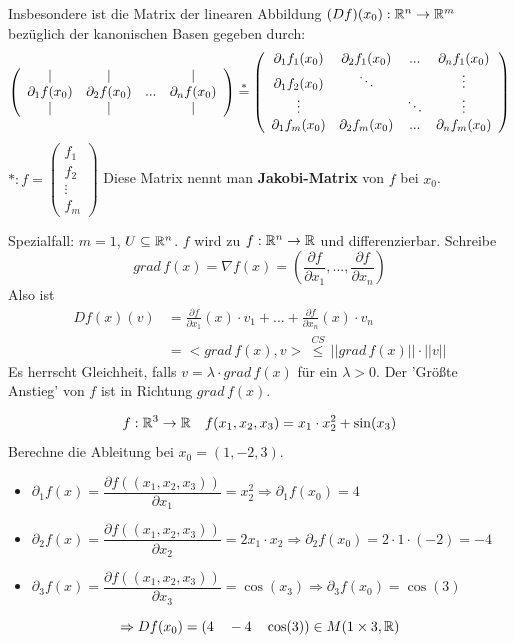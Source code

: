 \documentclass[main.tex]{subfiles}
\begin{document}
\begin{Bemerkung}
  Insbesondere ist die Matrix der linearen Abbildung $(Df)(x_0): \mathbb{R}^n \to \mathbb{R}^m$ bezüglich der kanonischen Basen gegeben durch:
  $$\left(\begin{array}{c c c c}
    | & | & & | \\
    \partial_1 f(x_0) & \partial_2 f(x_0) & ... & \partial_n f(x_0) \\
    | & | & & |
  \end{array}\right)
  \stackrel{*}{=}
  \left(\begin{array}{c c c c}
    \partial_1 f_1(x_0) & \partial_2 f_1(x_0) & ... & \partial_n f_1(x_0) \\
    \partial_1 f_2(x_0) & \ddots & & \vdots \\
    \vdots & & \ddots & \vdots \\
    \partial_1 f_m(x_0) & \partial_2 f_m(x_0) & ... & \partial_n f_m(x_0)
  \end{array}\right)$$
  $*: f = \left(\begin{array}{c}f_1\\f_2\\ \vdots \\f_m\end{array}\right)$
  Diese Matrix nennt man \textbf{Jakobi-Matrix} von $f$ bei $x_0$.

  Spezialfall: $m=1$, $U \subseteq \mathbb{R}^n$. $f$ wird zu $f: \mathbb{R}^n \to \mathbb{R}$ und differenzierbar. Schreibe
  $$grad \, f(x) = \nabla f(x) = \left(\frac{\partial f}{\partial x_1}, ...,  \frac{\partial f}{\partial x_n}\right)$$
  Also ist
  $$\begin{aligned}
    Df(x)(v) & = \frac{\partial f}{\partial x_1} (x) \cdot v_1 + ... + \frac{\partial f}{\partial x_n} (x) \cdot v_n \\
    & = < grad \, f(x), v > \, \stackrel{CS}{\leq} \, ||grad \, f(x)|| \cdot ||v||
  \end{aligned}$$
  Es herrscht Gleichheit, falls $v = \lambda \cdot grad \, f(x)$ für ein $\lambda > 0$. Der 'Größte Anstieg' von $f$ ist in Richtung $grad \, f(x)$.
\end{Bemerkung}

\begin{Beispiel}[$f:\R^3 \to \R$]
    $$f: \mathbb{R}^3 \to \mathbb{R} \quad f(x_1,x_2,x_3) = x_1 \cdot x_2^2 + \sin(x_3)$$
    Berechne die Ableitung bei $x_0 = (1,-2,3)$.
    \begin{itemize}
      \item $\partial_1 f(x) = \dfrac{\partial f((x_1,x_2,x_3))}{\partial x_1} = x_2^2 \Rightarrow \partial_1 f(x_0) = 4$
      \item $\partial_2 f(x) = \dfrac{\partial f((x_1,x_2,x_3))}{\partial x_2} = 2x_1 \cdot x_2 \Rightarrow \partial_2 f(x_0) = 2 \cdot 1 \cdot (-2) = -4$
      \item $\partial_3 f(x) = \dfrac{\partial f((x_1,x_2,x_3))}{\partial x_3} = \cos(x_3) \Rightarrow \partial_3 f(x_0) = \cos(3)$
    \end{itemize}
    $$\Rightarrow Df(x_0) = (4 \quad -4 \quad \cos(3)) \in M(1 \times 3, \mathbb{R})$$
\end{Beispiel}
\end{document}
